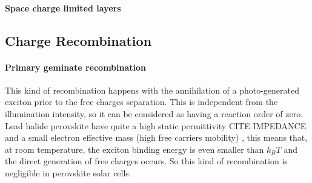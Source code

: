 		\paragraph{Space charge limited layers}

	\subsection{Charge Recombination}

		\paragraph{Primary geminate recombination} \label{intro_geminate} This kind of recombination happens with the annihilation of a photo-generated exciton prior to the free charges separation.
		This is independent from the illumination intensity, so it can be considered as having a reaction order of zero.
		Lead halide perovskite have quite a high static permittivity CITE IMPEDANCE and a small electron effective mass (high free carriers mobility) \cite{Herz2017}, this means that, at room temperature, the exciton binding energy is even smaller than $k_BT$ \cite{Miyata2015,Galkowski2016,Tvingstedt2015} and the direct generation of free charges occurs.
		So this kind of recombination is negligible in perovskite solar cells.

